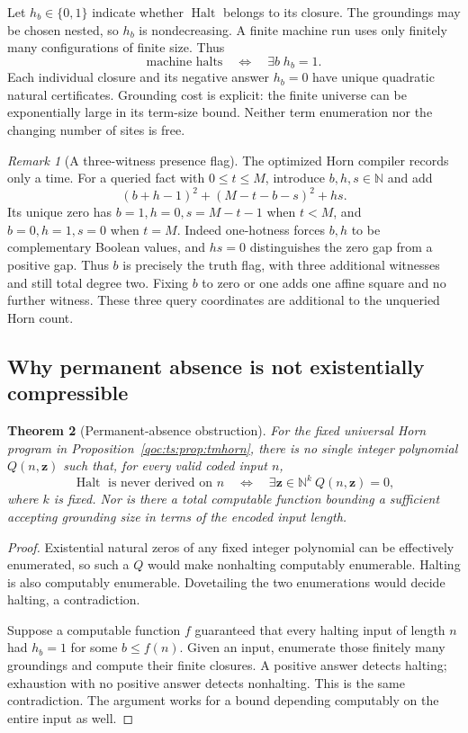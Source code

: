 \documentclass[11pt,letterpaper]{article}
\newtheorem{theorem}{Theorem}[section]
\theoremstyle{definition}
\theoremstyle{remark}
\newtheorem{remark}[theorem]{Remark}
\newcommand{\N}{\mathbb N}
\DeclareMathOperator{\Halt}{Halt}
\begin{document}
Let $h_b\in\{0,1\}$ indicate whether $\Halt$ belongs to its closure.
The groundings may be chosen nested, so $h_b$ is nondecreasing. A finite
machine run uses only finitely many configurations of finite size. Thus
\begin{equation}\label{qoc:ts:eq:haltexhaustion}
 \text{machine halts}\quad\Longleftrightarrow\quad
 \exists b\; h_b=1.
\end{equation}
Each individual closure and its negative answer $h_b=0$ have unique
quadratic natural certificates. Grounding cost is explicit: the finite
universe can be exponentially large in its term-size bound. Neither
term enumeration nor the changing number of sites is free.

\begin{remark}[A three-witness presence flag]
The optimized Horn compiler records only a time. For a queried fact with
$0\le t\le M$, introduce $b,h,s\in\N$ and add
\[
 (b+h-1)^2+(M-t-b-s)^2+hs.
\]
Its unique zero has $b=1,h=0,s=M-t-1$ when $t<M$, and
$b=0,h=1,s=0$ when $t=M$. Indeed one-hotness forces $b,h$ to be
complementary Boolean values, and $hs=0$ distinguishes the zero gap
from a positive gap. Thus $b$ is precisely the truth flag, with three
additional witnesses and still total degree two. Fixing $b$ to zero or
one adds one affine square and no further witness. These three query
coordinates are additional to the unqueried Horn count.
\end{remark}

\subsection{Why permanent absence is not existentially compressible}
\begin{theorem}[Permanent-absence obstruction]\label{qoc:ts:thm:absence}
For the fixed universal Horn program in Proposition~\ref{qoc:ts:prop:tmhorn},
there is no single integer polynomial $Q(n,\boldsymbol z)$ such that,
for every valid coded input $n$,
\[
 \Halt\text{ is never derived on }n
 \quad\Longleftrightarrow\quad
 \exists\boldsymbol z\in\N^k\ Q(n,\boldsymbol z)=0,
\]
where $k$ is fixed. Nor is there a total computable function bounding a
sufficient accepting grounding size in terms of the encoded input length.
\end{theorem}
\begin{proof}
Existential natural zeros of any fixed integer polynomial can be
effectively enumerated, so such a $Q$ would make nonhalting computably
enumerable. Halting is also computably enumerable. Dovetailing the two
enumerations would decide halting, a contradiction.

Suppose a computable function $f$ guaranteed that every halting input of
length $n$ had $h_b=1$ for some $b\le f(n)$. Given an input, enumerate
those finitely many groundings and compute their finite closures. A
positive answer detects halting; exhaustion with no positive answer
detects nonhalting. This is the same contradiction. The argument works
for a bound depending computably on the entire input as well.
\end{proof}
\end{document}
